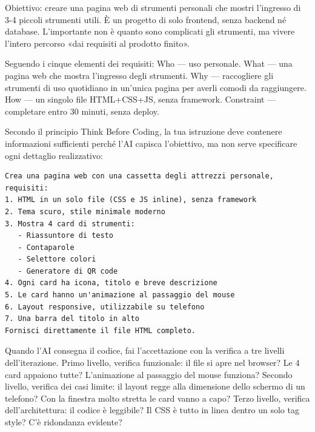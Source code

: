 



Obiettivo: creare una pagina web di strumenti personali che mostri l'ingresso di 3-4 piccoli strumenti utili. È un progetto di solo frontend, senza backend né database. L'importante non è quanto sono complicati gli strumenti, ma vivere l'intero percorso «dai requisiti al prodotto finito».

Seguendo i cinque elementi dei requisiti: Who — uso personale. What — una pagina web che mostra l'ingresso degli strumenti. Why — raccogliere gli strumenti di uso quotidiano in un'unica pagina per averli comodi da raggiungere. How — un singolo file HTML+CSS+JS, senza framework. Constraint — completare entro 30 minuti, senza deploy.


Secondo il principio Think Before Coding, la tua istruzione deve contenere informazioni sufficienti perché l'AI capisca l'obiettivo, ma non serve specificare ogni dettaglio realizzativo:

\begin{lstlisting}
Crea una pagina web con una cassetta degli attrezzi personale, requisiti:
1. HTML in un solo file (CSS e JS inline), senza framework
2. Tema scuro, stile minimale moderno
3. Mostra 4 card di strumenti:
   - Riassuntore di testo
   - Contaparole
   - Selettore colori
   - Generatore di QR code
4. Ogni card ha icona, titolo e breve descrizione
5. Le card hanno un'animazione al passaggio del mouse
6. Layout responsive, utilizzabile su telefono
7. Una barra del titolo in alto
Fornisci direttamente il file HTML completo.
\end{lstlisting}


Quando l'AI consegna il codice, fai l'accettazione con la verifica a tre livelli dell'iterazione. Primo livello, verifica funzionale: il file si apre nel browser? Le 4 card appaiono tutte? L'animazione al passaggio del mouse funziona? Secondo livello, verifica dei casi limite: il layout regge alla dimensione dello schermo di un telefono? Con la finestra molto stretta le card vanno a capo? Terzo livello, verifica dell'architettura: il codice è leggibile? Il CSS è tutto in linea dentro un solo tag style? C'è ridondanza evidente?

